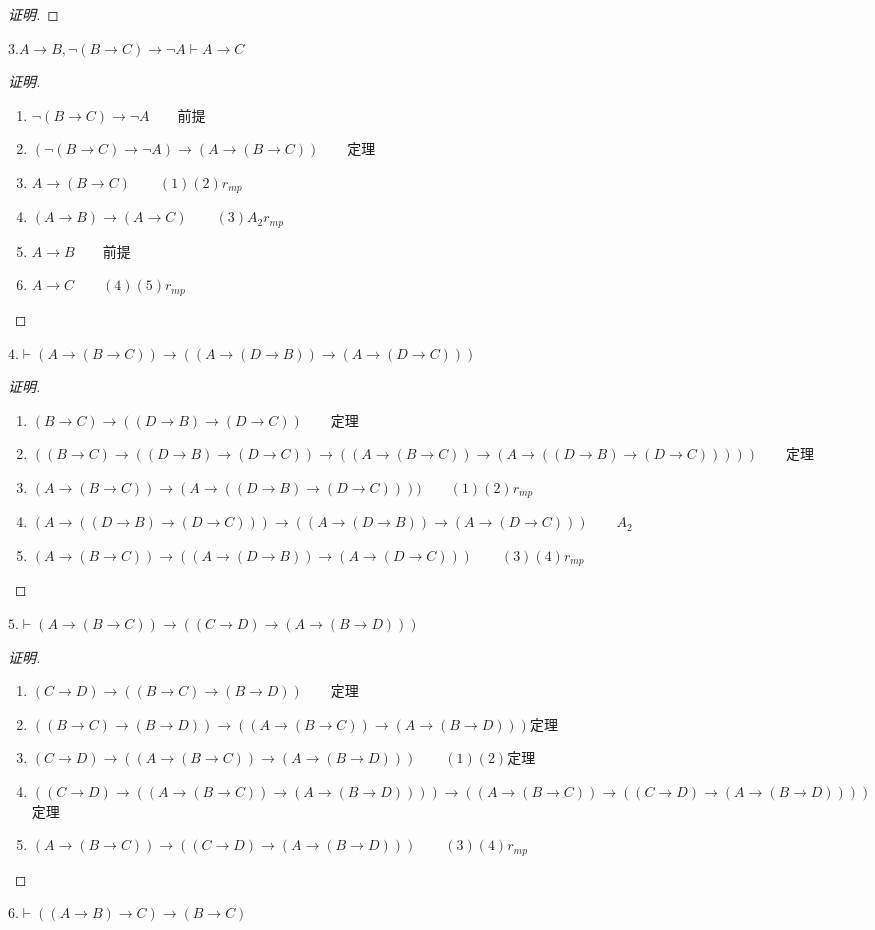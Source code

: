 \documentclass{article}
\begin{document}
\begin{CJK*}{UTF8}{gbsn}
\begin{proof}[证明]
\end{proof}

$3.A\to B, \lnot(B\to C)\to \lnot A\vdash A\to C$

\begin{proof}[证明]$\quad$
\begin{enumerate}
  \item $\lnot(B\to C)\to \lnot A\qquad$前提
  \item $(\lnot(B\to C)\to \lnot A)\to (A\to (B\to C))\qquad$定理
  \item $A\to (B\to C)\qquad (1)(2)r_{mp}$
  \item $(A\to B)\to (A\to C)\qquad(3)A_2r_{mp}$
  \item $A\to B\qquad$前提
  \item $A\to C\qquad(4)(5)r_{mp}$
\end{enumerate}  



\end{proof}

$4.\vdash (A\to (B\to C))\to ((A\to (D\to B))\to (A\to (D\to C)))$

\begin{proof}[证明]$\quad$
 \begin{enumerate}
  \item $(B\to C)\to ((D\to B)\to (D\to C))\qquad$定理
  \item $((B\to C)\to ((D\to B)\to (D\to C))\to ((A\to (B\to C))\to (A\to ((D\to B)\to (D\to C)))))\qquad$定理
  \item $(A\to (B\to C))\to (A\to ((D\to B)\to (D\to C))))\qquad(1)(2)r_{mp}$
  \item $(A\to ((D\to B)\to (D\to C)))\to ((A\to (D\to B))\to (A\to (D\to C)))\qquad A_2$
  \item $(A\to (B\to C))\to ((A\to (D\to B))\to (A\to (D\to C)))\qquad(3)(4)r_{mp}$
 \end{enumerate}
\end{proof}

$5.\vdash (A\to (B\to C))\to ((C\to D)\to (A\to (B\to D)))$

\begin{proof}[证明]$\quad$
\begin{enumerate}
  \item $(C\to D)\to ((B\to C)\to (B\to D))\qquad$定理
  \item $((B\to C)\to (B\to D))\to ((A\to (B\to C))\to (A\to (B\to D)))$定理
  \item $(C\to D)\to((A\to (B\to C))\to (A\to (B\to D)))\qquad(1)(2)$定理
  \item $((C\to D)\to((A\to (B\to C))\to (A\to (B\to D))))\to((A\to (B\to C))\to((C\to D)\to (A\to (B\to D))))\qquad$定理
  \item $(A\to (B\to C))\to ((C\to D)\to (A\to (B\to D)))\qquad(3)(4)r_{mp}$
\end{enumerate} 
\end{proof}
$6.\vdash ((A\to B)\to C)\to (B\to C)$


\end{CJK*}
\end{document}
